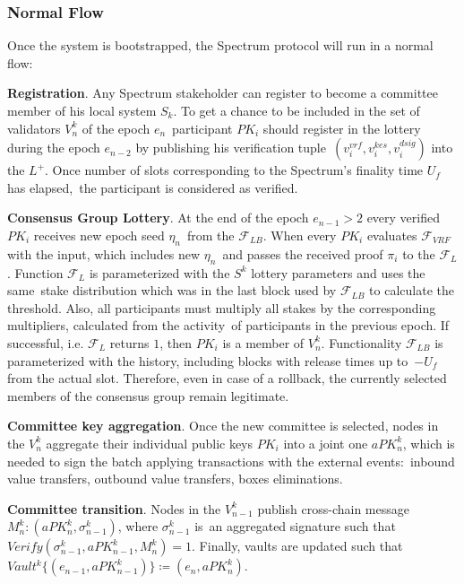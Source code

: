 \subsubsection{Normal Flow}\label{subsubsec:normal-flow}
Once the system is bootstrapped, the Spectrum protocol will run in a normal flow:
\begin{legal}
    \item \textbf{Registration}.
    Any Spectrum stakeholder can register to become a committee member of his local system $S_k$.
    To get a chance to be included in the set of validators $V^k_n$ of the epoch $e_n$\
    participant $PK_i$ should register in the lottery during the epoch $e_{n-2}$ by publishing his verification tuple\
    ${(v_i^{vrf}, v_i^{kes}, v_i^{dsig})}$ into the $L^+$.
    Once number of slots corresponding to the Spectrum's finality time $U_f$ has elapsed,\
    the participant is considered as verified.

    \item \textbf{Consensus Group Lottery}.
    At the end of the epoch ${e_{n-1} \gt 2}$ every verified $PK_i$ receives new epoch seed $\eta_n$\
    from the ${\mathcal{F}}_{LB}$.
    When every $PK_i$ evaluates ${\mathcal{F}}_{VRF}$ with the input, which includes new $\eta_n$\
    and passes the received proof $\pi_i$ to the ${\mathcal{F}}_{L}$.
    Function ${\mathcal{F}}_{L}$ is parameterized with the $S^k$ lottery parameters and uses the same\
    stake distribution which was in the last block used by ${\mathcal{F}}_{LB}$ to calculate the threshold.
    Also, all participants must multiply all stakes by the corresponding multipliers, calculated from the activity\
    of participants in the previous epoch.
    If successful, i.e. ${\mathcal{F}}_{L}$ returns $1$, then $PK_i$ is a member of $V^k_n$.
    Functionality ${\mathcal{F}}_{LB}$ is parameterized with the history, including blocks with release times up to\
    ${-U_f}$ from the actual slot.
    Therefore, even in case of a rollback, the currently selected members of the consensus group remain legitimate.

    \item \textbf{Committee key aggregation}.
    Once the new committee is selected, nodes in the $V^k_n$ aggregate their individual public keys $PK_i$ into
    a joint one $aPK^k_n$, which is needed to sign the batch applying transactions with the external events:\
    inbound value transfers, outbound value transfers, boxes eliminations.

    \item \textbf{Committee transition}.
    Nodes in the $V^k_{n - 1}$ publish cross-chain message ${M^k_n : (aPK^k_n, \sigma^k_{n-1})}$, where $\sigma^k_{n-1}$ is\
    an aggregated signature such that ${Verify(\sigma^k_{n-1}, aPK^k_{n-1}, M^k_n) = 1}$.
    Finally, vaults are updated such that ${Vault^k\{(e_{n-1}, aPK^k_{n-1})\} \coloneqq(e_n, aPK^k_n)}$.


\end{legal}
